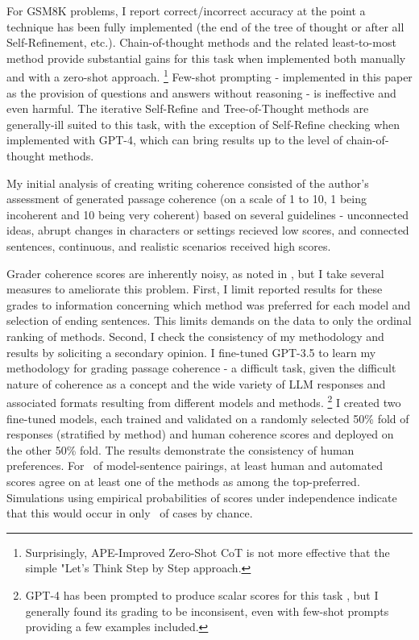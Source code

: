 \documentclass[11pt]{article}
\begin{document}
\begin{centering}


\end{centering}

For GSM8K problems, I report correct/incorrect accuracy at the point a technique has been fully implemented (the end of the tree of thought or after all Self-Refinement, etc.). Chain-of-thought methods and the related least-to-most method provide substantial gains for this task when implemented both manually and with a zero-shot approach. \footnote{Surprisingly, APE-Improved Zero-Shot CoT is not more effective that the simple "Let's Think Step by Step approach.} Few-shot prompting - implemented in this paper as the provision of questions and answers without reasoning - is ineffective and even harmful. The iterative Self-Refine and Tree-of-Thought methods are generally-ill suited to this task, with the exception of Self-Refine checking when implemented with GPT-4, which can bring results up to the level of chain-of-thought methods.

%

My initial analysis of creating writing coherence consisted of the author's assessment of generated passage coherence (on a scale of 1 to 10, 1 being incoherent and 10 being very coherent) based on several guidelines - unconnected ideas, abrupt changes in characters or settings recieved low scores, and connected sentences, continuous, and realistic scenarios received high scores.

Grader coherence scores are inherently noisy, as noted in \citealp{yao_tree_2023}, but I take several measures to ameliorate this problem. First, I limit reported results for these grades to information concerning which method was preferred for each model and selection of ending sentences. This limits demands on the data to only the ordinal ranking of methods. Second, I check the consistency of my methodology and results by soliciting a secondary opinion. I fine-tuned GPT-3.5 to learn my methodology for grading passage coherence - a difficult task, given the difficult nature of coherence as a concept and the wide variety of LLM responses and associated formats resulting from different models and methods. \footnote{GPT-4 has been prompted to produce scalar scores for this task \cite{yao_tree_2023}, but I generally found its grading to be inconsisent, even with few-shot prompts providing a few examples included.} I created two fine-tuned models, each trained and validated on a randomly selected 50\% fold of responses (stratified by method) and human coherence scores and deployed on the other 50\% fold. The results demonstrate the consistency of human preferences. For \pAtlOneHumanEqAggPct~of model-sentence pairings, at least human and automated scores agree on at least one of the methods as among the top-preferred. Simulations using empirical probabilities of scores under independence indicate that this would occur in only \simProbAgmtCmplStr~of cases by chance.
\end{document}
